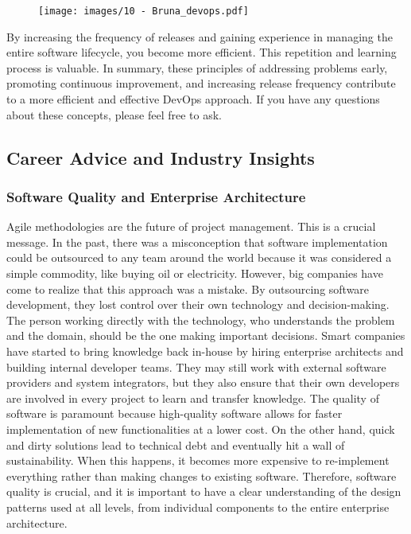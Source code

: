 \begin{figure}[!h]
  \centering
  \texttt{[image: images/10 - Bruna\_devops.pdf]}
\end{figure}

By increasing the frequency of releases and gaining experience in
managing the entire software lifecycle, you become more efficient. This
repetition and learning process is valuable. In summary, these
principles of addressing problems early, promoting continuous
improvement, and increasing release frequency contribute to a more
efficient and effective DevOps approach. If you have any questions about
these concepts, please feel free to ask.

\subsection{Career Advice and Industry Insights}

\subsubsection{Software Quality and Enterprise Architecture}

Agile methodologies are the future of project management. This is a
crucial message. In the past, there was a misconception that software
implementation could be outsourced to any team around the world because
it was considered a simple commodity, like buying oil or electricity.
However, big companies have come to realize that this approach was a
mistake. By outsourcing software development, they lost control over
their own technology and decision-making. The person working directly
with the technology, who understands the problem and the domain, should
be the one making important decisions. Smart companies have started to
bring knowledge back in-house by hiring enterprise architects and
building internal developer teams. They may still work with external
software providers and system integrators, but they also ensure that
their own developers are involved in every project to learn and transfer
knowledge. The quality of software is paramount because high-quality
software allows for faster implementation of new functionalities at a
lower cost. On the other hand, quick and dirty solutions lead to
technical debt and eventually hit a wall of sustainability. When this
happens, it becomes more expensive to re-implement everything rather
than making changes to existing software. Therefore, software quality is
crucial, and it is important to have a clear understanding of the design
patterns used at all levels, from individual components to the entire
enterprise architecture.

